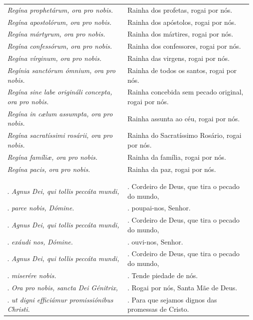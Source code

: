 \documentclass[a4paper,14pt]{extarticle} \usepackage[utf8]{inputenc}
\makeatletter
\newcommand{\vers@resp@sym}{%
  \raisebox{0.2ex}{\rotatebox[origin=c]{-20}{$\m@th\rceil$}}%
}
\newcommand{\vers@resp}[2]{%
  {\ooalign{%
     \hidewidth\kern#1\vers@resp@sym\hidewidth\cr
     #2\cr
  }}%
}
\DeclareRobustCommand{\versicle}{\vers@resp{-0.1em}{V}}
\DeclareRobustCommand{\response}{\vers@resp{0pt}{R}}
\makeatother
\begin{document}
\begin{center}
\begin{longtable}{p{}|p{}}
\textit{Regína prophetárum, ora pro nobis.} & Rainha dos profetas, rogai por nós. \\
\textit{Regína apostolórum, ora pro nobis.} & Rainha dos apóstolos, rogai por nós. \\
\textit{Regína mártyrum, ora pro nobis.} & Rainha dos mártires, rogai por nós. \\
\textit{Regína confessórum, ora pro nobis.} & Rainha dos confessores, rogai por nós. \\
\textit{Regína vírginum, ora pro nobis.} & Rainha das virgens, rogai por nós. \\
\textit{Regínia sanctórum ómnium, ora pro nobis.} & Rainha de todos os santos, rogai por nós. \\
\textit{Regína sine labe origináli concepta, ora pro nobis.} & Rainha concebida sem pecado original, rogai por nós. \\
\textit{Regína in c\ae{}lum assumpta, ora pro nobis.} & Rainha assunta ao céu, rogai por nós. \\
\textit{Regína sacratíssimi rosárii, ora pro nobis.} & Rainha do Sacratíssimo Rosário, rogai por nós. \\
\textit{Regína famíli\ae{}, ora pro nobis.} & Rainha da família, rogai por nós. \\
\textit{Regína pacis, ora pro nobis.} & Rainha da paz, rogai por nós. \\
\\
\\
\versicle. \textit{Agnus Dei, qui tollis peccáta mundi,} & \versicle.  Cordeiro de Deus, que tira o pecado do mundo, \\
\response. \textit{parce nobis, Dómine.} & \response. poupai-nos, Senhor. \\
\versicle. \textit{Agnus Dei, qui tollis peccáta mundi,} & \versicle. Cordeiro de Deus, que tira o pecado do mundo, \\
\response. \textit{exáudi nos, Dómine.} & \response. ouvi-nos, Senhor. \\
\versicle. \textit{Agnus Dei, qui tollis peccáta mundi,} & \versicle. Cordeiro de Deus, que tira o pecado do mundo, \\
\response. \textit{miserére nobis.} & \response. Tende piedade de nós. \\
\versicle. \textit{Ora pro nobis, sancta Dei Génitrix,} & \versicle. Rogai por nós, Santa Mãe de Deus. \\
\response. \textit{ut digni efficiámur promissiónibus Christi.} & \response. Para que sejamos dignos das promessas de Cristo. \\

\end{longtable}
\end{center}
\end{document}
